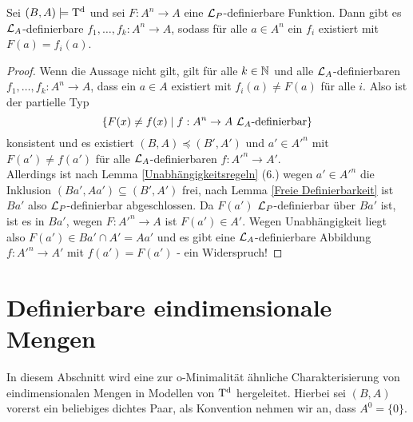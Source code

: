 \begin{lemma}
	Sei $(B,A)\models\operatorname{T^d}$ und sei $F:A^n\rightarrow A$ eine $\mathcal{L}_P$-definierbare Funktion. Dann gibt es $\mathcal{L}_A$-definierbare $f_1,\dots,f_k:A^n\rightarrow A$, sodass für alle $a\in A^n$ ein $f_i$ existiert mit $F(a)=f_i(a)$.
\end{lemma}
\begin{proof}
	Wenn die Aussage nicht gilt, gilt für alle $k\in\mathbb{N}$ und alle $\mathcal{L}_A$-definierbaren $f_1,\dots,f_k:A^n\rightarrow A$, dass ein $a\in A$ existiert mit $f_i(a)\neq F(a)$ für alle $i$. Also ist der partielle Typ $$\{F(x)\neq f(x)\mid f:A^n\rightarrow A\ \mathcal{L}_A\text{-definierbar}\}$$ konsistent und es existiert $(B,A)\preceq(B',A')$ und $a'\in A'^n$ mit $F(a')\neq f(a')$ für alle $\mathcal{L}_A$-definierbaren $f:A'^n\rightarrow A'$.\\
	Allerdings ist nach Lemma \ref{Unabhängigkeitsregeln} (6.) wegen $a'\in A'^n$ die Inklusion $(Ba',Aa')\subseteq(B',A')$ frei, nach Lemma \ref{Freie Definierbarkeit} ist $Ba'$ also $\mathcal{L}_P$-definierbar abgeschlossen. Da $F(a')$ $\mathcal{L}_P$-definierbar über $Ba'$ ist, ist es in $Ba'$, wegen $F:A'^n\rightarrow A$ ist $F(a')\in A'$. Wegen Unabhängigkeit liegt also $F(a')\in Ba'\cap A'=Aa'$ und es gibt eine $\mathcal{L}_A$-definierbare Abbildung $f:A'^n\rightarrow A'$ mit $f(a')=F(a')$ - ein Widerspruch!
\end{proof}

\section{Definierbare eindimensionale Mengen}
In diesem Abschnitt wird eine zur o-Minimalität ähnliche Charakterisierung von eindimensionalen Mengen in Modellen von $\operatorname{T^d}$ hergeleitet. Hierbei sei $(B,A)$ vorerst ein beliebiges dichtes Paar, als Konvention nehmen wir an, dass $A^0=\{0\}$.

